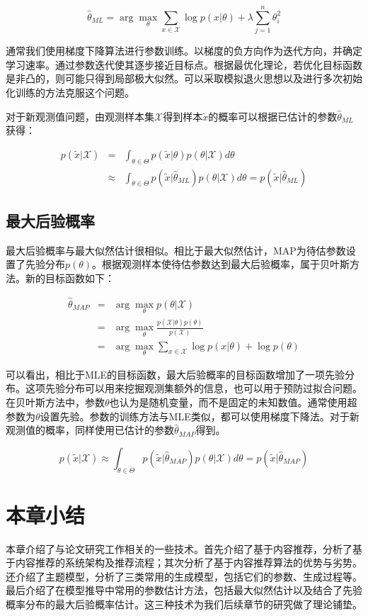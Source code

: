 \begin{equation}
	\hat{\theta}_{ML} = \arg\max_\theta \sum_{x \in \mathcal{X}}\log p(x|\theta) + \lambda\sum_{j=1}^n\theta_i^2
\end{equation}

通常我们使用梯度下降算法进行参数训练。以梯度的负方向作为迭代方向，并确定学习速率。通过参数迭代使其逐步接近目标点。根据最优化理论，若优化目标函数是非凸的，则可能只得到局部极大似然。可以采取模拟退火思想以及进行多次初始化训练的方法克服这个问题。

对于新观测值问题，由观测样本集$\mathcal{X}$得到样本$\tilde{x}$的概率可以根据已估计的参数$\hat{\theta}_{ML}$获得：

\begin{eqnarray}
p(\tilde{x}|\mathcal{X})& = &\int_{\theta \in \Theta}p(\tilde{x}|\theta)p(\theta|\mathcal{X})d\theta \nonumber \\
& \approx &\int_{\theta \in \Theta}p(\tilde{x}|\hat{\theta}_{ML})p(\theta|\mathcal{X})d\theta = p(\tilde{x}|\hat{\theta}_{ML})
\end{eqnarray}


\subsection{最大后验概率}

最大后验概率与最大似然估计很相似。相比于最大似然估计，MAP为待估参数设置了先验分布$p(\theta)$。根据观测样本使待估参数达到最大后验概率，属于贝叶斯方法。新的目标函数如下：

\begin{eqnarray}
	\hat{\theta}_{MAP} &=& \arg\max_\theta p(\theta|\mathcal{X}) \nonumber \\
	&=& \arg\max_\theta \frac{p(\mathcal{X}|\theta)p(\theta)}{p(\mathcal{X})} \nonumber \\
	&=& \arg\max_\theta {\sum_{x \in \mathcal{X}}\log p(x|\theta) + \log p(\theta)}
\end{eqnarray}

可以看出，相比于MLE的目标函数，最大后验概率的目标函数增加了一项先验分布。这项先验分布可以用来挖掘观测集额外的信息，也可以用于预防过拟合问题。在贝叶斯方法中，参数$\theta$也认为是随机变量，而不是固定的未知数值。通常使用超参数为$\theta$设置先验。参数的训练方法与MLE类似，都可以使用梯度下降法。对于新观测值的概率，同样使用已估计的参数$\hat{\theta}_{MAP}$得到。

\begin{equation}
p(\tilde{x}|\mathcal{X}) \approx \int_{\theta \in \Theta}p(\tilde{x}|\hat{\theta}_{MAP})p(\theta|\mathcal{X})d\theta = p(\tilde{x}|\hat{\theta}_{MAP})
\end{equation}
\fi

\section{本章小结}
本章介绍了与论文研究工作相关的一些技术。首先介绍了基于内容推荐，分析了基于内容推荐的系统架构及推荐流程；其次分析了基于内容推荐算法的优势与劣势。还介绍了主题模型，分析了三类常用的生成模型，包括它们的参数、生成过程等。最后介绍了在模型推导中常用的参数估计方法，包括最大似然估计以及结合了先验概率分布的最大后验概率估计。这三种技术为我们后续章节的研究做了理论铺垫。









